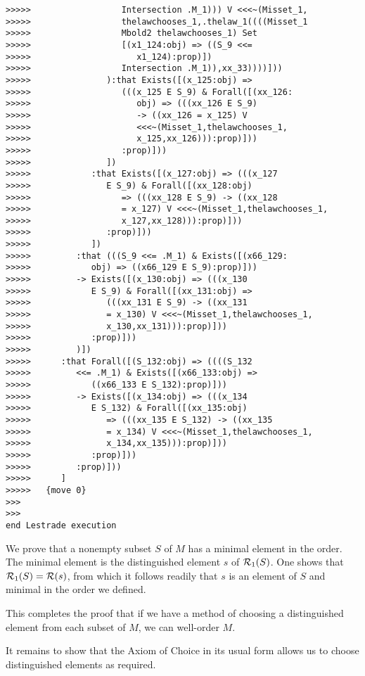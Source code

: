 \documentclass[12pt]{article}
\begin{document}
\begin{verbatim}
>>>>>                  Intersection .M_1))) V <<<~(Misset_1,
>>>>>                  thelawchooses_1,.thelaw_1((((Misset_1
>>>>>                  Mbold2 thelawchooses_1) Set
>>>>>                  [(x1_124:obj) => ((S_9 <<=
>>>>>                     x1_124):prop)])
>>>>>                  Intersection .M_1)),xx_33))))]))
>>>>>               ):that Exists([(x_125:obj) =>
>>>>>                  (((x_125 E S_9) & Forall([(xx_126:
>>>>>                     obj) => (((xx_126 E S_9)
>>>>>                     -> ((xx_126 = x_125) V
>>>>>                     <<<~(Misset_1,thelawchooses_1,
>>>>>                     x_125,xx_126))):prop)]))
>>>>>                  :prop)]))
>>>>>               ])
>>>>>            :that Exists([(x_127:obj) => (((x_127
>>>>>               E S_9) & Forall([(xx_128:obj)
>>>>>                  => (((xx_128 E S_9) -> ((xx_128
>>>>>                  = x_127) V <<<~(Misset_1,thelawchooses_1,
>>>>>                  x_127,xx_128))):prop)]))
>>>>>               :prop)]))
>>>>>            ])
>>>>>         :that (((S_9 <<= .M_1) & Exists([(x66_129:
>>>>>            obj) => ((x66_129 E S_9):prop)]))
>>>>>         -> Exists([(x_130:obj) => (((x_130
>>>>>            E S_9) & Forall([(xx_131:obj) =>
>>>>>               (((xx_131 E S_9) -> ((xx_131
>>>>>               = x_130) V <<<~(Misset_1,thelawchooses_1,
>>>>>               x_130,xx_131))):prop)]))
>>>>>            :prop)]))
>>>>>         )])
>>>>>      :that Forall([(S_132:obj) => ((((S_132
>>>>>         <<= .M_1) & Exists([(x66_133:obj) =>
>>>>>            ((x66_133 E S_132):prop)]))
>>>>>         -> Exists([(x_134:obj) => (((x_134
>>>>>            E S_132) & Forall([(xx_135:obj)
>>>>>               => (((xx_135 E S_132) -> ((xx_135
>>>>>               = x_134) V <<<~(Misset_1,thelawchooses_1,
>>>>>               x_134,xx_135))):prop)]))
>>>>>            :prop)]))
>>>>>         :prop)]))
>>>>>      ]
>>>>>   {move 0}
>>>
>>>
end Lestrade execution
\end{verbatim}

We prove that a nonempty subset $S$ of $M$ has a minimal element in the order.  The minimal element is the distinguished element $s$ of ${\cal R}_1(S)$.  One shows
that ${\cal R}_1(S) = {\cal R}(s)$, from which it follows readily that $s$ is an element of $S$ and minimal in the order we defined.

This completes the proof that if we have a method of choosing a distinguished element from each subset of $M$, we can well-order $M$.

It remains to show that the Axiom of Choice in its usual form allows us to choose distinguished elements as required.
\end{document}
